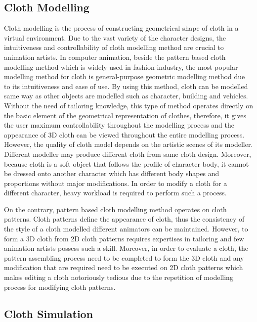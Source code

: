 \subsection{Cloth Modelling}

Cloth modelling is the process of constructing geometrical shape of cloth in a virtual environment. Due to the vast variety of the character designs, the intuitiveness and controllability of cloth modelling method are crucial to animation artists. In computer animation, beside the pattern based cloth modelling method which is widely used in fashion industry, the most popular modelling method for cloth is general-purpose geometric modelling method due to its intuitiveness and ease of use. By using this method, cloth can be modelled same way as other objects are modelled such as character, building and  vehicles. Without the need of tailoring knowledge, this type of method operates directly on the basic element of the geometrical representation of clothes, therefore, it gives the user maximum controllability throughout the modelling process and the appearance of 3D cloth can be viewed throughout the entire modelling process. However, the quality of cloth model depends on the artistic scenes of its modeller. Different modeller may produce different cloth from same cloth design. Moreover, because cloth is a soft object that follows the profile of character body, it cannot be dressed onto another character which has different body shapes and proportions without major modifications. In order to modify a cloth for a different character, heavy workload is required to perform such a process.  

On the contrary, pattern based cloth modelling method operates on cloth patterns. Cloth patterns define the appearance of cloth, thus the consistency of the style of a cloth modelled different animators can be maintained. However, to form a 3D cloth from 2D cloth patterns requires expertises in tailoring and few animation artists possess such a skill. Moreover, in order to evaluate a cloth, the pattern assembling process need to be completed to form the 3D cloth and any modification that are required need to be executed on 2D cloth patterns which makes editing a cloth notoriously tedious due to the repetition of modelling process for modifying cloth patterns.   

\subsection{Cloth Simulation}

